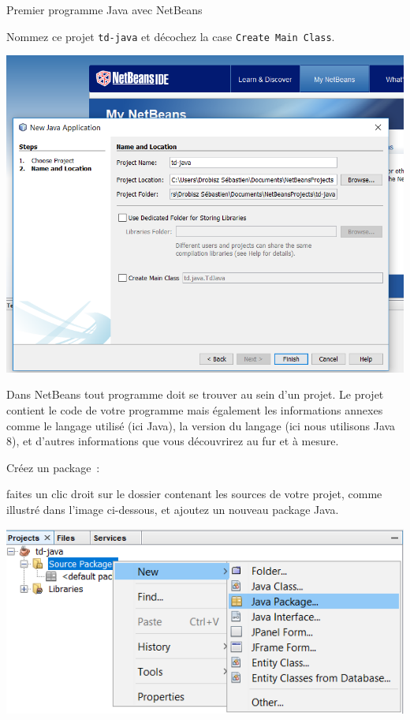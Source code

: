 \documentclass[a4paper,11pt]{article}
\begin{document}
\begin{Tutoriel}{Premier programme Java avec NetBeans}
\begin{steps}
			Nommez ce projet \texttt{td-java} et décochez la case \texttt{Create Main Class}.
			
			\begin{center}
				\includegraphics[width=\textwidth]{images/nb_newproject_name}
			\end{center}
			
			Dans NetBeans tout programme doit se trouver au sein d'un projet.
			Le projet contient le code de votre programme mais également les 
			informations annexes comme le langage utilisé (ici Java), 
			la version du langage (ici nous utilisons Java 8), 
			et d'autres informations que vous découvrirez au fur et à mesure.



		\item Créez un package~: 
		
			faites un clic droit sur le dossier contenant les sources de votre projet, 
			comme illustré dans l'image ci-dessous, et ajoutez un nouveau package Java.
		
			\bigskip
			\begin{center}
				\includegraphics[width=\textwidth]{images/nb_newproject_package}
			\end{center}


\end{steps}
\end{Tutoriel}
\end{document}
